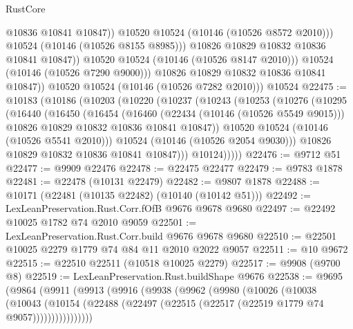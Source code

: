 \begin{lexlean}{RustCore}
\begin{coremodule}
                          @10836
                          @10841
                          @10847))
                      @10520
                      @10524
                      (@10146 (@10526 @8572 @2010)))
                    @10524
                    (@10146 (@10526 @8155 @8985)))
                  @10826
                  @10829
                  @10832
                  @10836
                  @10841
                  @10847))
              @10520
              @10524
              (@10146 (@10526 @8147 @2010)))
            @10524
            (@10146 (@10526 @7290 @9000)))
          @10826
          @10829
          @10832
          @10836
          @10841
          @10847))
      @10520
      @10524
      (@10146 (@10526 @7282 @2010)))
    @10524
@22475 := @10183
    (@10186
      (@10203
        (@10220
          (@10237
            (@10243
              (@10253
                (@10276
                  (@10295
                    (@16440
                      (@16450
                        (@16454
                          (@16460
                            (@22434 (@10146 (@10526 @5549 @9015)))
                            @10826
                            @10829
                            @10832
                            @10836
                            @10841
                            @10847))
                        @10520
                        @10524
                        (@10146 (@10526 @5541 @2010)))
                      @10524
                      (@10146 (@10526 @2054 @9030)))
                    @10826
                    @10829
                    @10832
                    @10836
                    @10841
                    @10847)))
              @10124)))))
@22476 := @9712 @51
@22477 := @9909 @22476
@22478 := @22475 @22477
@22479 := @9783 @1878
@22481 := @22478 (@10131 @22479)
@22482 := @9807 @1878
@22488 := @10171 (@22481 (@10135 @22482) (@10140 (@10142 @51)))
@22492 := LexLeanPreservation.Rust.Corr.fOfB @9676 @9678 @9680
@22497 := @22492 @10025 @1782 @74 @2010 @9059
@22501 := LexLeanPreservation.Rust.Corr.build @9676 @9678 @9680
@22510 := @22501 @10025 @2279 @1779 @74 @84 @11 @2010 @2022 @9057
@22511 := @10 @9672
@22515 := @22510 @22511 (@10518 @10025 @2279)
@22517 := @9908 (@9700 @8)
@22519 := LexLeanPreservation.Rust.buildShape @9676
@22538 := @9695
    (@9864
      (@9911
        (@9913
          (@9916
            (@9938
              (@9962
                (@9980
                  (@10026
                    (@10038
                      (@10043
                        (@10154
                          (@22488 (@22497 (@22515 (@22517 (@22519 @1779 @74 @9057))))))))))))))))

\end{coremodule}
\end{lexlean}
